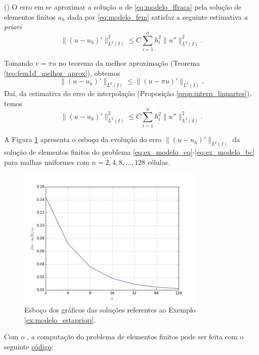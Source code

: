 \begin{teo}()
  O erro em se aproximar a solução $u$ de \eqref{eq:modelo_ffraca} pela solução de elementos finitos $u_h$ dada por \eqref{eq:modelo_fem} satisfaz a seguinte estimativa {\it a priori}
\begin{equation}
  \|(u-u_h)'\|_{L^2(I)}^2 \leq C\sum_{i=1}^n h_i^2\|u''\|_{L^2(I)}^2.
\end{equation}
\end{teo}
\begin{dem}
  Tomando $v = \pi u$ no teorema da melhor aproximação (Teorema \ref{teo:fem1d_melhor_aprox}), obtemos
  \begin{equation}
    \|(u-u_h)'\|_{L^2(I)} \leq \|(u-\pi u)'\|_{L^2(I)}.
  \end{equation}
Daí, da estimativa do erro de interpolação (Proposição \ref{prop:interp_linpartes}), temos
\begin{equation}
  \|(u-u_h)'\|_{L^2(I)}^2 \leq C\sum_{i=1}^n h_i^2\|u''\|_{L^2(I)}^2.
\end{equation}
\end{dem}

\begin{ex}\label{ex:modelo_estapriori}
  A Figura \ref{fig:ex_modelo_estapriori} apresenta o esboço da evolução do erro $\|(u - u_h)'\|_{L^2(I)}$ da solução de elementos finitos do problema \eqref{eq:ex_modelo_eq}-\eqref{eq:ex_modelo_bc} para malhas uniformes com $n=2, 4, 8, \ldots, 128$ células.

\begin{figure}[h!]
  \centering
  \includegraphics[width=0.8\textwidth]{./cap_mef1d/dados/ex_modelo_estapriori/ex_modelo_estapriori}
  \caption{Esboço dos gráficos das soluções referentes ao Exemplo \ref{ex:modelo_estapriori}.}
  \label{fig:ex_modelo_estapriori}
\end{figure}

\ifispython
Com o \fenics, a computação do problema de elementos finitos pode ser feita com o seguinte \href{https://github.com/phkonzen/notas/blob/master/src/MetodoElementosFinitos/cap_mef1d/dados/ex_modelo_estapriori/ex_modelo_estapriori.py}{código}:

\fi
\end{ex}

